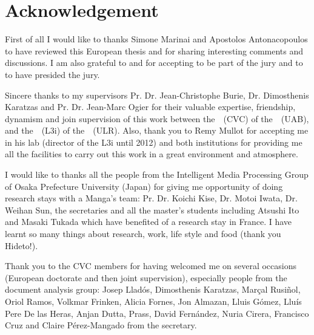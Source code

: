 \chapter*{Acknowledgement}

First of all I would like to thanks Simone Marinai and Apostolos Antonacopoulos to have reviewed this European thesis and for sharing interesting comments and discussions.
I am also grateful to  and  for accepting to be part of the jury and to  to have presided the jury.

Sincere thanks to my supervisors Pr. Dr. Jean-Christophe Burie, Dr. Dimosthenis Karatzas and Pr. Dr. Jean-Marc Ogier for their valuable expertise, friendship, dynamism and join supervision of this work between the~\CVC~(CVC) of the~\UAB~(UAB), and the~\LIII~(L3i) of the~\ULR~(ULR).
Also, thank you to Remy Mullot for accepting me in his lab (director of the L3i until 2012) and both institutions for providing me all the facilities to carry out this work in a great environment and atmosphere.

I would like to thanks all the people from the Intelligent Media Processing Group of Osaka Prefecture University (Japan) for giving me opportunity of doing research stays with a Manga's team: Pr. Dr. Koichi Kise, Dr. Motoi Iwata, Dr. Weihan Sun, the secretaries and all the master's students including Atsushi Ito and Masaki Tukada which have benefited of a research stay in France.
I have learnt so many things about research, work, life style and food (thank you Hideto!).

Thank you to the CVC members for having welcomed me on several occasions (European doctorate and then joint supervision), especially people from the document analysis group: Josep Llad\'{o}s, Dimosthenis Karatzas, Marçal Rusiñol, Oriol Ramos, Volkmar Frinken, Alicia Fornes, Jon Almazan, Lluis G\'{o}mez, Llu\'{i}s Pere De las Heras, Anjan Dutta, Prass, David Fern\'{a}ndez, Nuria Cirera, Francisco Cruz and Claire Pérez-Mangado from the secretary.
\\


